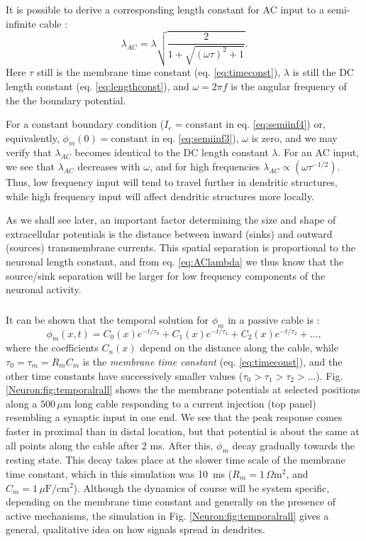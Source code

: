 It is possible to derive a corresponding length constant for AC input to a semi-infinite cable \cite{Pettersen2008a}: 
\begin{equation}
\lambda_{AC} = \lambda \sqrt{ \frac{2}{1+\sqrt{(\omega \tau)^2 + 1}} }.
\label{eq:AClambda}
\end{equation}
Here $\tau$ still is the membrane time constant (eq. \ref{eq:timeconst}), $\lambda$ is still the DC length constant (eq. \ref{eq:lengthconst}), and $\omega = 2\pi f$ is the angular frequency of the the boundary potential.

For a constant boundary condition ($I_e = \text{constant}$ in eq. \ref{eq:semiinf4}) or, equivalently, $\phi_m(0) = \text{constant}$ in eq. \ref{eq:semiinf3}), $\omega$ is zero, and we may verify that $\lambda_{AC}$ becomes identical to the DC length constant $\lambda$. For an AC input, we see that $\lambda_{AC}$ decreases with $\omega$, and for high frequencies $\lambda_{AC} \propto (\omega \tau^{-1/2})$. Thus, low frequency input will tend to travel further in dendritic structures, while high frequency input will affect dendritic structures more locally. 

As we shall see later, an important factor determining the size and shape of extracellular potentials is the distance between inward (sinks) and outward (sources) transmembrane currents. This spatial separation is proportional to the neuronal length constant, and from eq. \ref{eq:AClambda} we thus know that the source/sink separation will be larger for low frequency components of the neuronal activity.


\subsubsection{}
It can be shown that the temporal solution for $\phi_m$ in a passive cable is \cite{rall1969}:
\begin{equation}
\phi_m(x,t) = C_0(x) e^{-t/\tau_0} + C_1(x) e^{-t/\tau_1} + C_2(x) e^{-t/\tau_2} + \ldots, 
\label{eq:cabletemporal}
\end{equation}
where the coefficients $C_n(x)$ depend on the distance along the cable, while $\tau_0 = \tau_m = R_m C_m$ is the \emph{membrane time constant} (eq. \ref{eq:timeconst}), and the other time constants have successively smaller values ($\tau_0 > \tau_1 > \tau_2 > \ldots$). Fig. \ref{Neuron:fig:temporalrall} shows the the membrane potentials at selected positions along a $500 \, \mu$m long cable responding to a current injection (top panel) resembling a synaptic input in one end. We see that the peak response comes faster in proximal than in distal location, but that potential is about the same at all points along the cable after 2 ms. After this, $\phi_m$  decay gradually towards the resting state. This decay takes place at the slower time scale of the membrane time constant, which in this simulation was 10~ms ($R_m=1\,\Omega \text{m}^2$, and $C_m=1\,\mu\text{F}/\text{cm}^2$). Although the dynamics of course will be system specific, depending on the membrane time constant and generally on the presence of active mechanisms, the simulation in Fig. \ref{Neuron:fig:temporalrall} gives a general, qualitative idea on how signals spread in dendrites.


